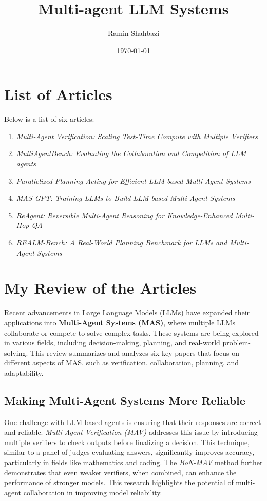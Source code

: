 \documentclass[a4paper,12pt]{article}
\title{Multi-agent LLM Systems}
\author{Ramin Shahbazi}
\date{\today}
\begin{document}
\maketitle

\section{List of Articles}
Below is a list of six articles:

\begin{enumerate}
    \item \textit{Multi-Agent Verification: Scaling Test-Time Compute with Multiple Verifiers}
    \item \textit{MultiAgentBench: Evaluating the Collaboration and Competition of LLM agents}
    \item \textit{Parallelized Planning-Acting for Efficient LLM-based Multi-Agent Systems}
    \item \textit{MAS-GPT: Training LLMs to Build LLM-based Multi-Agent Systems}
    \item \textit{ReAgent: Reversible Multi-Agent Reasoning for Knowledge-Enhanced Multi-Hop QA}
    \item \textit{REALM-Bench: A Real-World Planning Benchmark for LLMs and Multi-Agent Systems}
  
\end{enumerate}

\newpage

\section{My Review of the Articles}

Recent advancements in Large Language Models (LLMs) have expanded their applications into \textbf{Multi-Agent Systems (MAS)}, where multiple LLMs collaborate or compete to solve complex tasks. These systems are being explored in various fields, including decision-making, planning, and real-world problem-solving. This review summarizes and analyzes six key papers that focus on different aspects of MAS, such as verification, collaboration, planning, and adaptability.

\subsection{Making Multi-Agent Systems More Reliable}  
One challenge with LLM-based agents is ensuring that their responses are correct and reliable. \textit{Multi-Agent Verification (MAV)} addresses this issue by introducing multiple verifiers to check outputs before finalizing a decision. This technique, similar to a panel of judges evaluating answers, significantly improves accuracy, particularly in fields like mathematics and coding. The \textit{BoN-MAV} method further demonstrates that even weaker verifiers, when combined, can enhance the performance of stronger models. This research highlights the potential of multi-agent collaboration in improving model reliability.
\end{document}
